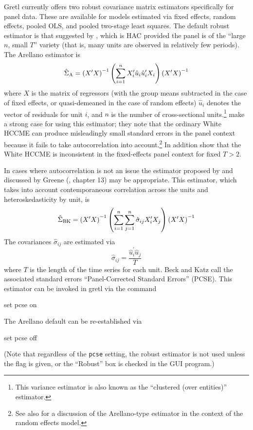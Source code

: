 Gretl currently offers two robust covariance matrix estimators
specifically for panel data.  These are available for models estimated
via fixed effects, random effects, pooled OLS, and pooled two-stage
least squares.  The default robust estimator is that suggested by
\cite{arellano03}, which is HAC provided the panel is of the ``large
$n$, small $T$'' variety (that is, many units are observed in
relatively few periods).  The Arellano estimator is
\[
\hat{\Sigma}_{\rm A} = 
\left(X^{\prime}X\right)^{-1}
\left( \sum_{i=1}^n X_i^{\prime} \hat{u}_i 
    \hat{u}_i^{\prime} X_i \right)
\left(X^{\prime}X\right)^{-1}
\]
where $X$ is the matrix of regressors (with the group means subtracted
in the case of fixed effects, or quasi-demeaned in the case of random
effects) $\hat{u}_i$ denotes the vector of residuals for unit $i$, and
$n$ is the number of cross-sectional units.\footnote{This variance
  estimator is also known as the ``clustered (over entities)''
  estimator.}  \cite{cameron-trivedi05} make a strong case for using
this estimator; they note that the ordinary White HCCME can produce
misleadingly small standard errors in the panel context because it
fails to take autocorrelation into account.\footnote{See also
  \cite{cameron-miller15} for a discussion of the Arellano-type
  estimator in the context of the random effects model.}
In addition \cite{stock-watson08} show that the White HCCME
is inconsistent in the fixed-effects panel context for fixed $T > 2$.

In cases where autocorrelation is not an issue the estimator
proposed by \cite{beck-katz95} and discussed by Greene
(\citeyear{greene03}, chapter 13) may be appropriate.  This estimator,
which takes into account contemporaneous correlation across the units
and heteroskedasticity by unit, is
\[
\hat{\Sigma}_{\rm BK} = 
\left(X^{\prime}X\right)^{-1}
\left( \sum_{i=1}^n \sum_{j=1}^n \hat{\sigma}_{ij} X^{\prime}_iX_j \right)
\left(X^{\prime}X\right)^{-1}
\]
The covariances $\hat{\sigma}_{ij}$ are estimated via
\[
\hat{\sigma}_{ij} = \frac{\hat{u}^{\prime}_i \hat{u}_j}{T}
\]
where $T$ is the length of the time series for each unit.  Beck and
Katz call the associated standard errors ``Panel-Corrected Standard
Errors'' (PCSE).  This estimator can be invoked in gretl via the
command 
%
\begin{code}
set pcse on
\end{code}
%
The Arellano default can be re-established via 
%
\begin{code}
set pcse off
\end{code}
%
(Note that regardless of the \texttt{pcse} setting, the robust
estimator is not used unless the  flag is given, or the
``Robust'' box is checked in the GUI program.)


